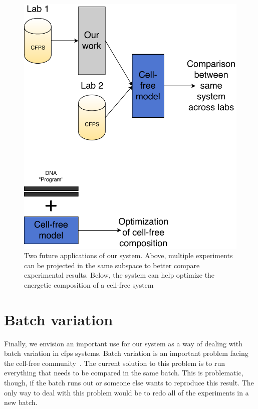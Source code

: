 \begin{figure}[t!]
\begin{center}
\includegraphics{figs/Applications.pdf}
\caption[Future applications for our system]
{Two future applications of our system.
Above, multiple experiments can be projected in the same subspace to better compare experimental results.
Below, the system can help optimize the energetic composition of a cell-free system}
\end{center}
\label{fig:apps}
\end{figure}

\section{Batch variation}
Finally, we envision an important use for our system as a way of dealing with batch variation in \gls{cfps} systems.
Batch variation is an important problem facing the cell-free community~\cite{sun2013protocols, chizzolini2017cell}.
The current solution to this problem is to run everything that needs to be compared in the same batch.
This is problematic, though, if the batch runs out or someone else wants to reproduce this result.
The only way to deal with this problem would be to redo all of the experiments in a new batch.

